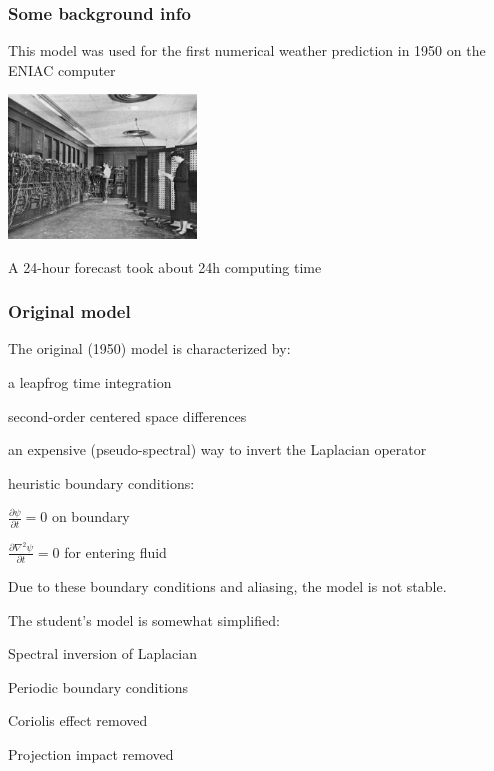\documentclass[aspectratio=43,9pt]{beamer}
\begin{document}
\begin{frame}
	\frametitle{Some background info}
	\begin{myitemize}{2ex}
		\item This model was used for the first numerical weather prediction in 1950 on the ENIAC computer
			\begin{center}
				\includegraphics[width=5cm]{ENIAC}
			\end{center}
		\item A 24-hour forecast took about 24h computing time
	\end{myitemize}
\end{frame}
%
%
\begin{frame}
	\frametitle{Original model}
	The original (1950) model is characterized by:
	\begin{myitemize}{1ex}
		\item a leapfrog time integration
		\item second-order centered space differences
		\item an expensive (pseudo-spectral) way to invert the Laplacian operator
		\item heuristic boundary conditions:
			\begin{myitemize}{1ex}
				\item $\frac{\partial \psi}{\partial t}=0$ on boundary
				\item $\frac{\partial \nabla^2 \psi}{\partial t}=0$ for entering fluid
			\end{myitemize}
	\end{myitemize}
	Due to these boundary conditions and aliasing, the model is not stable.
	\par\vspace*{4ex}
	The student's model is somewhat simplified:
	\begin{myitemize}{1ex}
		\item Spectral inversion of Laplacian
		\item Periodic boundary conditions
		\item Coriolis effect removed
		\item Projection impact removed
	\end{myitemize}
\end{frame}
\end{document}
